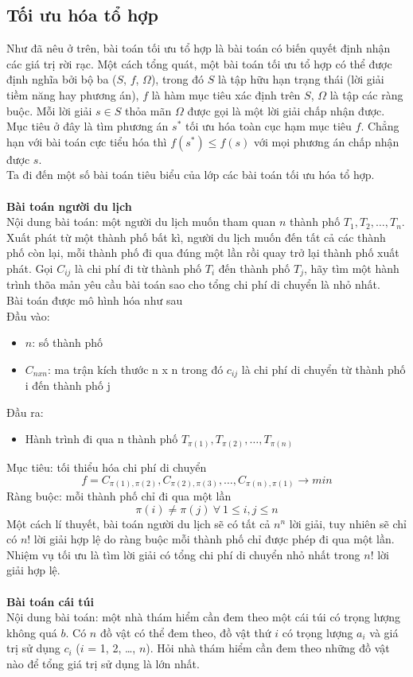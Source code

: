 \subsection{Tối ưu hóa tổ hợp}
Như đã nêu ở trên, bài toán tối ưu tổ hợp là bài toán có biến quyết định nhận các giá trị rời rạc. Một cách tổng quát, một bài toán tối ưu tổ hợp có thể được định nghĩa bởi bộ ba ($S$, $f$, $\Omega$), trong đó $S$ là tập hữu hạn trạng thái (lời giải tiềm năng hay phương án), $f$ là hàm mục tiêu xác định trên $S$, $\Omega$ là tập các ràng buộc. Mỗi lời giải $s\in S$ thỏa mãn $\Omega$ được gọi là một lời giải chấp nhận được. Mục tiêu ở đây là tìm phương án $s^*$ tối ưu hóa toàn cục hạm mục tiêu $f$. Chẳng hạn với bài toán cực tiểu hóa thì $f(s^*) \leq f(s)$ với mọi phương án chấp nhận được $s$.
\\Ta đi đến một số bài toán tiêu biểu của lớp các bài toán tối ưu hóa tổ hợp. 
\\ \\\textbf{Bài toán người du lịch}
\\Nội dung bài toán: một người du lịch muốn tham quan $n$ thành phố $T_1, T_2, …, T_n$. Xuất phát từ một thành phố bất kì, người du lịch muốn đến tất cả các thành phố còn lại, mỗi thành phố đi qua đúng một lần rồi quay trở lại thành phố xuất phát. Gọi $C_{ij}$ là chi phí đi từ thành phố $T_i$ đến thành phố $T_j$, hãy tìm một hành trình thõa mản yêu cầu bài toán sao cho tổng chi phí di chuyển là nhỏ nhất.
\\Bài toán được mô hình hóa như sau 
\\Đầu vào:
\begin{itemize}
    \item $n$: số thành phố 
    \item $C_{nxn}$: ma trận kích thước n x n trong đó $c_{ij}$ là chi phí di chuyển từ thành phố i đến thành phố j
\end{itemize}
Đầu ra:
\begin{itemize}
    \item Hành trình đi qua n thành phố $T_{\pi(1)}, T_{\pi(2)}, …, T_{\pi(n)}$
\end{itemize}
Mục tiêu: tối thiểu hóa chi phí di chuyển  
\begin{equation}
    f = C_{\pi(1),\pi(2)}, C_{\pi(2),\pi(3)}, …, C_{\pi(n),\pi(1)} \rightarrow min
\end{equation}
Ràng buộc: mỗi thành phố chỉ đi qua một lần 
\begin{equation}
    \pi(i) \neq \pi(j) ~\forall ~1 \leq i, j \leq n
\end{equation}
Một cách lí thuyết, bài toán người du lịch sẽ có tất cả $n^n$ lời giải, tuy nhiên sẽ chỉ có $n!$ lời giải hợp lệ do ràng buộc mỗi thành phố chỉ được phép đi qua một lần. Nhiệm vụ tối ưu là tìm lời giải có tổng chi phí di chuyển nhỏ nhất trong $n!$ lời giải hợp lệ.
\\ \\\textbf{Bài toán cái túi}
\\Nội dung bài toán: một nhà thám hiểm cần đem theo một cái túi có trọng lượng không quá $b$. Có $n$ đồ vật có thể đem theo, đồ vật thứ $i$ có trọng lượng $a_i$ và giá trị sử dụng $c_i$ ($i$ = 1, 2, …, $n$). Hỏi nhà thám hiểm cần đem theo những đồ vật nào để tổng giá trị sử dụng là lớn nhất.

